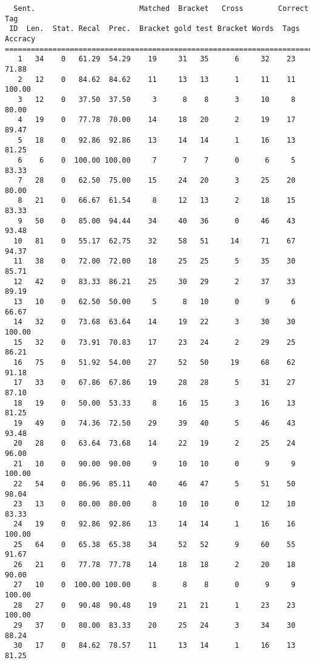 \scriptsize
\begin{verbatim}
  Sent.                        Matched  Bracket   Cross        Correct Tag
 ID  Len.  Stat. Recal  Prec.  Bracket gold test Bracket Words  Tags Accracy
============================================================================
   1   34    0   61.29  54.29    19     31   35      6     32    23    71.88
   2   12    0   84.62  84.62    11     13   13      1     11    11   100.00
   3   12    0   37.50  37.50     3      8    8      3     10     8    80.00
   4   19    0   77.78  70.00    14     18   20      2     19    17    89.47
   5   18    0   92.86  92.86    13     14   14      1     16    13    81.25
   6    6    0  100.00 100.00     7      7    7      0      6     5    83.33
   7   28    0   62.50  75.00    15     24   20      3     25    20    80.00
   8   21    0   66.67  61.54     8     12   13      2     18    15    83.33
   9   50    0   85.00  94.44    34     40   36      0     46    43    93.48
  10   81    0   55.17  62.75    32     58   51     14     71    67    94.37
  11   38    0   72.00  72.00    18     25   25      5     35    30    85.71
  12   42    0   83.33  86.21    25     30   29      2     37    33    89.19
  13   10    0   62.50  50.00     5      8   10      0      9     6    66.67
  14   32    0   73.68  63.64    14     19   22      3     30    30   100.00
  15   32    0   73.91  70.83    17     23   24      2     29    25    86.21
  16   75    0   51.92  54.00    27     52   50     19     68    62    91.18
  17   33    0   67.86  67.86    19     28   28      5     31    27    87.10
  18   19    0   50.00  53.33     8     16   15      3     16    13    81.25
  19   49    0   74.36  72.50    29     39   40      5     46    43    93.48
  20   28    0   63.64  73.68    14     22   19      2     25    24    96.00
  21   10    0   90.00  90.00     9     10   10      0      9     9   100.00
  22   54    0   86.96  85.11    40     46   47      5     51    50    98.04
  23   13    0   80.00  80.00     8     10   10      0     12    10    83.33
  24   19    0   92.86  92.86    13     14   14      1     16    16   100.00
  25   64    0   65.38  65.38    34     52   52      9     60    55    91.67
  26   21    0   77.78  77.78    14     18   18      2     20    18    90.00
  27   10    0  100.00 100.00     8      8    8      0      9     9   100.00
  28   27    0   90.48  90.48    19     21   21      1     23    23   100.00
  29   37    0   80.00  83.33    20     25   24      3     34    30    88.24
  30   17    0   84.62  78.57    11     13   14      1     16    13    81.25

\end{verbatim}
